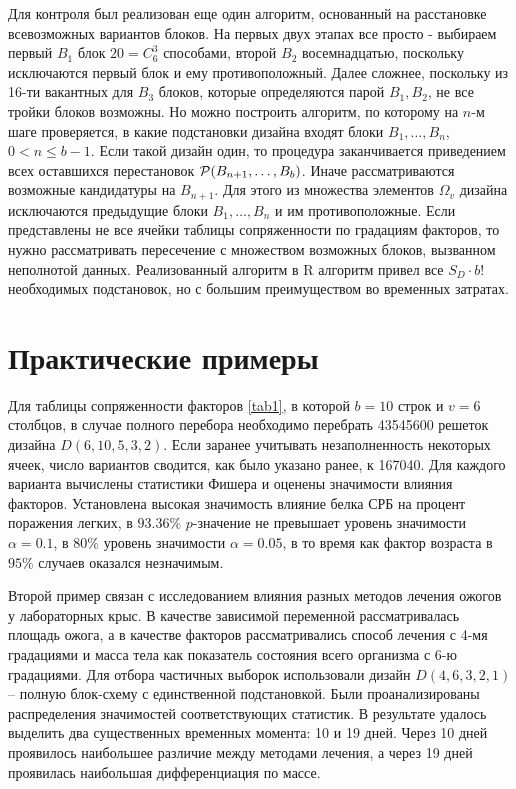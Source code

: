 \documentclass{math-mech-sci}
\begin{document}
Для контроля  был реализован еще один алгоритм, основанный на расстановке всевозможных вариантов блоков. 
На первых двух этапах все просто - выбираем первый  $B_1$ блок $20=C_6^3$ способами, второй  $B_2$ восемнадцатью, поскольку исключаются первый блок и ему противоположный.  Далее сложнее, поскольку из 16-ти   вакантных для $B_3$  блоков, которые определяются парой $B_1,B_2$,   не все тройки блоков  возможны. 
Но  можно построить алгоритм, по которому на  $n$-м  шаге проверяется, в какие подстановки дизайна входят  блоки $B_1,\ldots,B_n$, $0<n\leq {b-1}$. Если такой дизайн один, то процедура заканчивается приведением  всех оставшихся перестановок ${\cal P}(B_{n+1},\ldots,B_b)$. Иначе рассматриваются возможные кандидатуры на $B_{n+1}$. Для этого из множества элементов $\Omega_v$ дизайна исключаются предыдущие блоки  $B_1,\ldots,B_n$ и им противоположные. Если представлены не все ячейки таблицы сопряженности по градациям факторов, то нужно рассматривать пересечение с множеством возможных блоков, вызванном неполнотой данных.  
Реализованный алгоритм в R алгоритм привел все $S_D\cdot b!$ необходимых подстановок, но с большим преимуществом во временных затратах. 





\section{Практические примеры }

Для таблицы сопряженности факторов \ref{tab1}, в которой  $b=10$  строк и $v=6$ столбцов, в случае полного перебора необходимо перебрать 
43545600 решеток  дизайна $D(6,10,5,3,2)$. Если заранее учитывать незаполненность некоторых  ячеек, число вариантов сводится, как было указано ранее,  к 
167040. Для каждого варианта  вычислены статистики Фишера и оценены значимости влияния факторов. Установлена высокая значимость влияние белка СРБ на процент поражения легких,  в $ 93.36\%  $ $p$-значение не превышает уровень значимости $\alpha=0.1$, в $ 80\%  $  уровень значимости $\alpha=0.05$, в то время как фактор возраста в  $95\%$ случаев оказался незначимым.

Второй пример связан с исследованием влияния разных методов лечения ожогов у лабораторных крыс. В качестве зависимой переменной рассматривалась площадь ожога, а  в качестве факторов рассматривались способ лечения с 4-мя градациями и масса тела как показатель состояния всего организма с 6-ю градациями. 
Для отбора частичных выборок использовали  дизайн $D(4,6,3,2,1)$ -- полную блок-схему с единственной подстановкой. Были проанализированы распределения значимостей соответствующих статистик. В результате удалось  выделить два существенных временных момента: 10 и 19 дней. Через 10 дней проявилось наибольшее различие между методами лечения, а через 19 дней проявилась наибольшая дифференциация по массе. 
\end{document}
